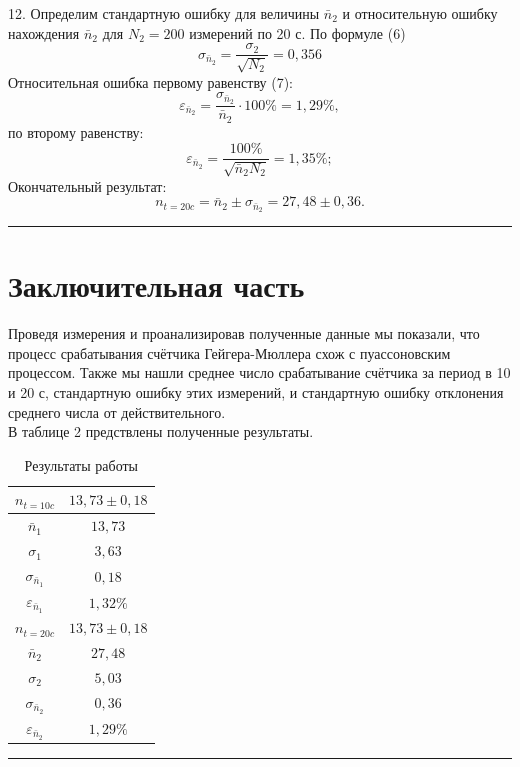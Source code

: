 \documentclass[a4paper,12pt]{article} %
\begin{document}
12. Определим стандартную ошибку для величины $ \bar{n}_2 $ и относительную ошибку нахождения $ \bar{n}_2 $ для $ N_2 = 200 $ измерений по 20 с. По формуле (6)
\[ \sigma_{\bar{n}_2} = \frac{\sigma_2}{\sqrt{N_2}}=0,356  \]
Относительная ошибка первому равенству (7):
\[ \varepsilon_{\bar{n}_2} = \frac{\sigma_{\bar{n}_2}}{\bar{n}_2} \cdot 100\% =1,29\%, \]
по второму равенству:
\[ \varepsilon_{\bar{n}_2} = \frac{100\%}{\sqrt{\bar{n}_2 N_2}} =1,35\%; \]
Окончательный результат:
\[ n_{t=20c}=\bar{n}_2 \pm \sigma_{\bar{n}_2}=27,48\pm 0,36. \]









\medskip\hrule\medskip

\section{Заключительная часть}

Проведя измерения и проанализировав полученные данные мы показали, что процесс срабатывания счётчика Гейгера-Мюллера схож с пуассоновским процессом. Также мы нашли среднее число срабатывание счётчика за период в 10 и 20 с, стандартную ошибку этих измерений, и стандартную ошибку отклонения среднего числа от действительного.\\
В таблице 2 предствлены полученные результаты.

\begin{table}[h]
\centering
\caption{Результаты работы}
\begin{tabular}{|c|c|}
\hline 
$n_{t=10c}$ & $13,73\pm 0,18$ \\ 
\hline 
$\bar{n}_1$ & $13,73$ \\ 
\hline 
$\sigma_1$ & $3,63$ \\ 
\hline 
$ \sigma_{\bar{n}_1}$ & $ 0,18 $ \\ 
\hline 
$ \varepsilon_{\bar{n}_1}$ & $ 1,32\% $ \\ 
\hline 
$n_{t=20c}$ & $13,73\pm 0,18$ \\ 
\hline 
$\bar{n}_2$ & $27,48$ \\ 
\hline 
$\sigma_2$ & $ 5,03 $\\ 
\hline 
$ \sigma_{\bar{n}_2}$ & $ 0,36  $ \\ 
\hline 
$ \varepsilon_{\bar{n}_2}$ & $1,29\%$ \\ 
\hline 
\end{tabular} 
\end{table}

\medskip\hrule\medskip
\end{document}
